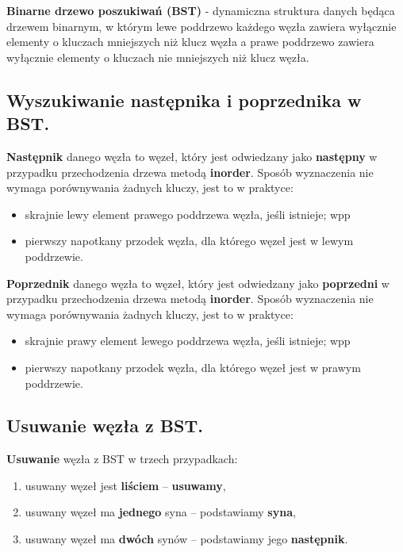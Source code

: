 \documentclass[main.tex]{subfiles}
\begin{document}
    \begin{definition}
        \textbf{Binarne drzewo poszukiwań (BST)} - dynamiczna struktura danych będąca drzewem binarnym, w którym lewe
        poddrzewo każdego węzła zawiera wyłącznie elementy o kluczach mniejszych niż klucz węzła a prawe poddrzewo
        zawiera wyłącznie elementy o kluczach nie mniejszych niż klucz węzła.
    \end{definition}

    \subsection{Wyszukiwanie następnika i poprzednika w BST.}
    \begin{definition}
        \textbf{Następnik} danego węzła to węzeł, który jest odwiedzany jako \textbf{następny} w przypadku przechodzenia drzewa
        metodą \textbf{inorder}. Sposób wyznaczenia nie wymaga porównywania żadnych kluczy, jest to w praktyce:
        \begin{itemize}[noitemsep]
            \item skrajnie lewy element prawego poddrzewa węzła, jeśli istnieje; wpp
            \item pierwszy napotkany przodek węzła, dla którego węzeł jest w lewym poddrzewie.
        \end{itemize}
    \end{definition}

    \begin{definition}
        \textbf{Poprzednik} danego węzła to węzeł, który jest odwiedzany jako \textbf{poprzedni} w przypadku przechodzenia drzewa
        metodą \textbf{inorder}. Sposób wyznaczenia nie wymaga porównywania żadnych kluczy, jest to w praktyce:
        \begin{itemize}[noitemsep]
            \item skrajnie prawy element lewego poddrzewa węzła, jeśli istnieje; wpp
            \item pierwszy napotkany przodek węzła, dla którego węzeł jest w prawym poddrzewie.
        \end{itemize}
    \end{definition}

    \subsection{Usuwanie węzła z BST.}

    \begin{theorem}
        \textbf{Usuwanie} węzła z BST w trzech przypadkach:
        \begin{enumerate}[noitemsep]
            \item usuwany węzeł jest \textbf{liściem} -- \textbf{usuwamy},
            \item usuwany węzeł ma \textbf{jednego} syna -- podstawiamy \textbf{syna},
            \item usuwany węzeł ma \textbf{dwóch} synów -- podstawiamy jego \textbf{następnik}.
        \end{enumerate}
    \end{theorem}
\end{document}
